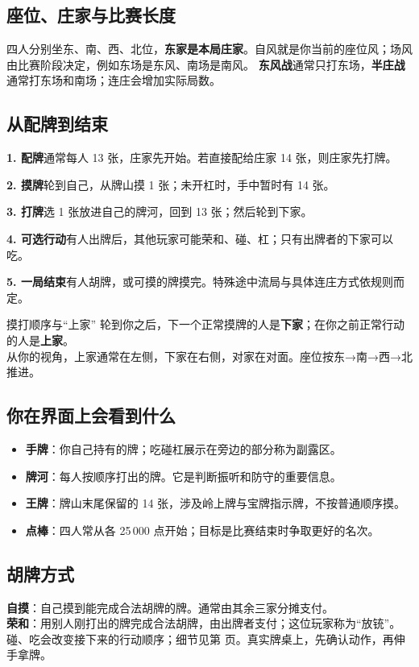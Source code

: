 \documentclass[UTF8,a4paper,zihao=5,fontset=fandol]{ctexart}
\newcommand{\smalltext}[1]{{\small\color{muted}#1}}
\newcommand{\key}[1]{\textbf{\color{teal}#1}}
\newcommand{\flowbox}[2]{\begin{tcolorbox}[colback=paper,boxsep=0pt,top=1.6mm,bottom=1.6mm]
 \textbf{\color{teal}#1}\quad #2\end{tcolorbox}}
\begin{document}
\subsection{座位、庄家与比赛长度}
四人分别坐东、南、西、北位，\key{东家是本局庄家}。自风就是你当前的座位风；场风由比赛阶段决定，例如东场是东风、南场是南风。
\textbf{东风战}通常只打东场，\textbf{半庄战}通常打东场和南场；连庄会增加实际局数。

\subsection{从配牌到结束}
\flowbox{1. 配牌}{通常每人 13 张，庄家先开始。若直接配给庄家 14 张，则庄家先打牌。}
\flowbox{2. 摸牌}{轮到自己，从牌山摸 1 张；未开杠时，手中暂时有 14 张。}
\flowbox{3. 打牌}{选 1 张放进自己的牌河，回到 13 张；然后轮到下家。}
\flowbox{4. 可选行动}{有人出牌后，其他玩家可能荣和、碰、杠；只有出牌者的下家可以吃。}
\flowbox{5. 一局结束}{有人胡牌，或可摸的牌摸完。特殊途中流局与具体连庄方式依规则而定。}

\begin{note}{摸打顺序与“上家”}
轮到你之后，下一个正常摸牌的人是\textbf{下家}；在你之前正常行动的人是\textbf{上家}。\\
从你的视角，上家通常在左侧，下家在右侧，对家在对面。座位按东→南→西→北推进。
\end{note}
\subsection{你在界面上会看到什么}
\begin{itemize}
\item \textbf{手牌}：你自己持有的牌；吃碰杠展示在旁边的部分称为副露区。
\item \textbf{牌河}：每人按顺序打出的牌。它是判断振听和防守的重要信息。
\item \textbf{王牌}：牌山末尾保留的 14 张，涉及岭上牌与宝牌指示牌，不按普通顺序摸。
\item \textbf{点棒}：四人常从各 25\,000 点开始；目标是比赛结束时争取更好的名次。
\end{itemize}
\subsection{胡牌方式}
\key{自摸}：自己摸到能完成合法胡牌的牌。通常由其余三家分摊支付。\\
\key{荣和}：用别人刚打出的牌完成合法胡牌，由出牌者支付；这位玩家称为“放铳”。
\smalltext{碰、吃会改变接下来的行动顺序；细节见第 \pageref{calls} 页。真实牌桌上，先确认动作，再伸手拿牌。}
\end{document}
